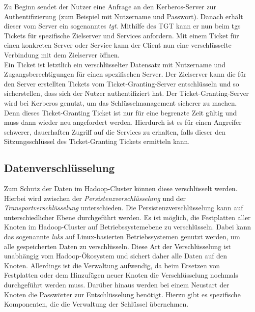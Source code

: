 \noindent
Zu Beginn sendet der Nutzer eine Anfrage an den Kerberos-Server zur Authentifizierung (zum Beispiel mit Nutzername und Passwort). Danach erhält dieser vom Server ein sogenanntes \textit{\gls{tgt}}. Mithilfe des TGT kann er nun beim \gls{tgs} Tickets für spezifische Zielserver und Services anfordern. Mit einem Ticket für einen konkreten Server oder Service kann der Client nun eine verschlüsselte Verbindung mit dem Zielserver öffnen.\\
Ein Ticket ist letztlich ein verschlüsselter Datensatz mit Nutzername und Zugangsberechtigungen für einen spezifischen Server. Der Zielserver kann die für den Server erstellten Tickets vom Ticket-Granting-Server entschlüsseln und so sicherstellen, dass sich der Nutzer authentifiziert hat. Der Ticket-Granting-Server wird bei Kerberos genutzt, um das Schlüsselmanagement sicherer zu machen. Denn dieses Ticket-Granting Ticket ist nur für eine begrenzte Zeit gültig und muss dann wieder neu angefordert werden. Hierdurch ist es für einen Angreifer schwerer, dauerhaften Zugriff auf die Services zu erhalten, falls dieser den Sitzungsschlüssel des Ticket-Granting Tickets ermitteln kann.\cite[S. 425-429]{crypto}\\


\subsection{Datenverschlüsselung}
Zum Schutz der Daten im Hadoop-Cluster können diese verschlüsselt werden. Hierbei wird zwischen der \textit{Persistenzverschlüsselung} und der \textit{Transportverschlüsselung} unterschieden. Die Persistenzverschlüsselung kann auf unterschiedlicher Ebene durchgeführt werden. 
Es ist möglich, die Festplatten aller Knoten im Hadoop-Cluster auf Betriebssystemebene zu verschlüsseln. Dabei kann das sogenannte \textit{\gls{luks}} auf Linux-basierten Betriebssystemen genutzt werden, um alle gespeicherten Daten zu verschlüsseln. Diese Art der Verschlüsselung ist unabhängig vom Hadoop-Ökosystem und sichert daher alle Daten auf den Knoten. Allerdings ist die Verwaltung aufwendig, da beim Ersetzen von Festplatten oder dem Hinzufügen neuer Knoten die Verschlüsselung nochmals durchgeführt werden muss. Darüber hinaus werden bei einem Neustart der Knoten die Passwörter zur Entschlüsselung benötigt. Hierzu gibt es spezifische Komponenten, die die Verwaltung der Schlüssel übernehmen. \cite[S. 202-204]{hadoop_security}\\

